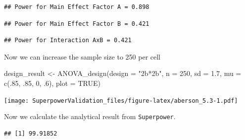 \documentclass[
]{book}
\newenvironment{Shaded}{\begin{snugshade}}{\end{snugshade}}
\newcommand{\AttributeTok}[1]{\textcolor[rgb]{0.77,0.63,0.00}{#1}}
\newcommand{\ConstantTok}[1]{\textcolor[rgb]{0.00,0.00,0.00}{#1}}
\newcommand{\DecValTok}[1]{\textcolor[rgb]{0.00,0.00,0.81}{#1}}
\newcommand{\FloatTok}[1]{\textcolor[rgb]{0.00,0.00,0.81}{#1}}
\newcommand{\FunctionTok}[1]{\textcolor[rgb]{0.00,0.00,0.00}{#1}}
\newcommand{\NormalTok}[1]{#1}
\newcommand{\OtherTok}[1]{\textcolor[rgb]{0.56,0.35,0.01}{#1}}
\newcommand{\SpecialCharTok}[1]{\textcolor[rgb]{0.00,0.00,0.00}{#1}}
\newcommand{\StringTok}[1]{\textcolor[rgb]{0.31,0.60,0.02}{#1}}
\begin{document}
\begin{verbatim}
## Power for Main Effect Factor A = 0.898
\end{verbatim}

\begin{verbatim}
## Power for Main Effect Factor B = 0.421
\end{verbatim}

\begin{verbatim}
## Power for Interaction AxB = 0.421
\end{verbatim}

Now we can increase the sample size to 250 per cell

\begin{Shaded}
\begin{Highlighting}[]
\NormalTok{design\_result }\OtherTok{\textless{}{-}} \FunctionTok{ANOVA\_design}\NormalTok{(}\AttributeTok{design =} \StringTok{"2b*2b"}\NormalTok{,}
                              \AttributeTok{n =} \DecValTok{250}\NormalTok{,}
                              \AttributeTok{sd =} \FloatTok{1.7}\NormalTok{,}
                              \AttributeTok{mu =} \FunctionTok{c}\NormalTok{(.}\DecValTok{85}\NormalTok{, .}\DecValTok{85}\NormalTok{, }
                                     \DecValTok{0}\NormalTok{, .}\DecValTok{6}\NormalTok{),}
                              \AttributeTok{plot =} \ConstantTok{TRUE}\NormalTok{)}
\end{Highlighting}
\end{Shaded}

\texttt{[image: SuperpowerValidation\_files/figure-latex/aberson\_5.3-1.pdf]}

Now we calculate the analytical result from \texttt{Superpower}.

\begin{Shaded}
\end{Shaded}

\begin{verbatim}
## [1] 99.91852
\end{verbatim}

\begin{Shaded}
\end{Shaded}
\end{document}
